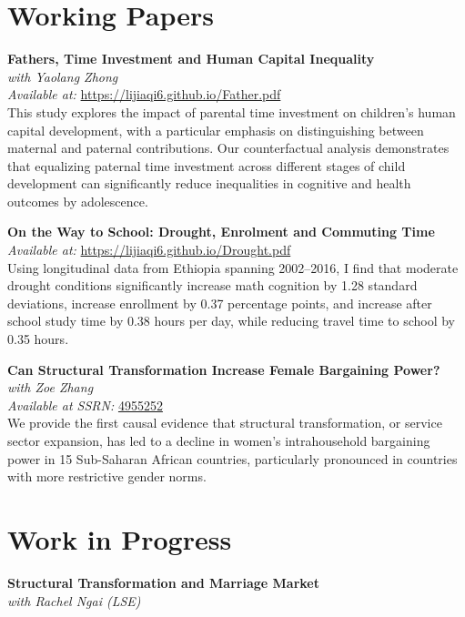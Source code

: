 \documentclass[11pt,a4paper]{article}
\begin{document}
\section{Working Papers}

\textbf{Fathers, Time Investment and Human Capital Inequality} \\
\textit{with Yaolang Zhong} \\
\textit{Available at:} \href{https://lijiaqi6.github.io/Father.pdf}{https://lijiaqi6.github.io/Father.pdf} \\

This study explores the impact of parental time investment on children's human capital development, with a particular emphasis on distinguishing between maternal and paternal contributions. Our counterfactual analysis demonstrates that equalizing paternal time investment across different stages of child development can significantly reduce inequalities in cognitive and health outcomes by adolescence.

\textbf{On the Way to School: Drought, Enrolment and Commuting Time} \\
\textit{Available at:} \href{https://lijiaqi6.github.io/Drought.pdf}{https://lijiaqi6.github.io/Drought.pdf} \\

Using longitudinal data from Ethiopia spanning 2002–2016, I find that moderate drought conditions significantly increase math cognition by 1.28 standard deviations, increase enrollment by 0.37 percentage points, and increase after school study time by 0.38 hours per day, while reducing travel time to school by 0.35 hours.

\textbf{Can Structural Transformation Increase Female Bargaining Power?} \\
\textit{with Zoe Zhang} \\
\textit{Available at SSRN:} \href{https://papers.ssrn.com/sol3/papers.cfm?abstract_id=4955252}{4955252} \\

We provide the first causal evidence that structural transformation, or service sector expansion, has led to a decline in women's intrahousehold bargaining power in 15 Sub-Saharan African countries, particularly pronounced in countries with more restrictive gender norms.

\section{Work in Progress}
\textbf{Structural Transformation and Marriage Market} \\
\textit{with Rachel Ngai (LSE)} \\
\end{document}
